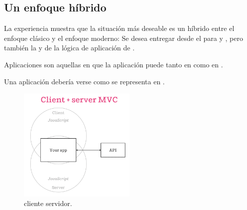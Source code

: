 \begin{itemize}
\end{itemize}


\subsection{Un enfoque híbrido}

La experiencia muestra que la situación más deseable es un híbrido entre el enfoque clásico y el enfoque moderno: Se desea entregar \htmlNAME \fullyFormedCPT desde el \serverAS para \performanceQA y \seoINT, pero también la \speedQA y \flexibilityQA de la lógica de aplicación de \clientSideAS.

Aplicaciones \isomorphicAS \javaScriptNAME son aquellas en que la aplicación \javaScriptNAME puede \runCPT tanto en \clientSideAS como en \serverSideAS.

Una aplicación \isomorphicAS debería verse como se representa en .

\begin{figure}[H]
	\centering
	\includegraphics[width=0.5\textwidth]{figuras/estadoArte/isomorphic-client-server-mvc.png}
	\caption{\mvcAS \isomorphicAS  cliente servidor.}
	\label{figure:isomorphic_client_server_mvc}
\end{figure}

